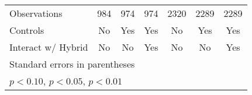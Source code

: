\begin{table}[htbp]
\begin{tabular}{l*{6}{c}}
\hline
Observations&      984         &      974         &      974         &     2320         &     2289         &     2289         \\
Controls  &       No         &      Yes         &      Yes         &       No         &      Yes         &      Yes         \\
Interact w/ Hybrid&       No         &       No         &      Yes         &       No         &       No         &      Yes         \\
\hline\hline
\multicolumn{7}{l}{\footnotesize Standard errors in parentheses}\\
\multicolumn{7}{l}{\footnotesize \sym{*} \(p<0.10\), \sym{**} \(p<0.05\), \sym{***} \(p<0.01\)}\\
\end{tabular}
\end{table}
